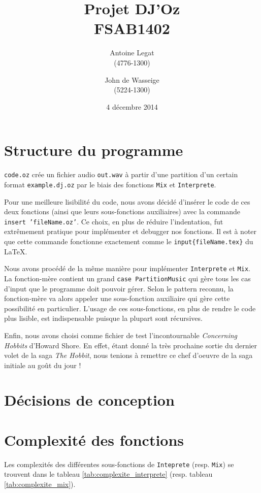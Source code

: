 \documentclass[a4paper,oneside,10pt]{article}
\title{Projet DJ'Oz \\ \small{FSAB1402}}
\author{Antoine Legat \\(4776-1300) \and John de Wasseige \\(5224-1300)}
\date{4 décembre 2014}
\newcommand{\fun}[1]{\texttt{#1}}
\newcommand{\bslash}{\texttt{\symbol{92}}}
\begin{document}
\maketitle

\section{Structure du programme}
\fun{code.oz} crée un fichier audio \fun{out.wav} à partir d'une partition d'un certain format \fun{example.dj.oz} par le biais des fonctions \fun{Mix} et \fun{Interprete}.

Pour une meilleure lisibilité du code, nous avons décidé d'insérer le code de ces deux fonctions (ainsi que leurs sous-fonctions auxiliaires) avec la commande \fun{\bslash insert 'fileName.oz'}. Ce choix, en plus de réduire l'indentation, fut extrêmement pratique pour implémenter et debugger nos fonctions. Il est à noter que cette commande fonctionne exactement comme le \fun{\bslash input\{fileName.tex\}} du \LaTeX.

Nous avons procédé de la même manière pour implémenter \fun{Interprete} et \fun{Mix}. La fonction-mère contient un grand \fun{case Partition\bslash Music} qui gère tous les cas d'input que le programme doit pouvoir gérer. Selon le pattern reconnu, la fonction-mère va alors appeler une sous-fonction auxiliaire qui gère cette possibilité en particulier. L'usage de ces sous-fonctions, en plus de rendre le code plus lisible, est indispensable puisque la plupart sont récursives.

Enfin, nous avons choisi comme fichier de test l'incontournable \textit{Concerning Hobbits} d'Howard Shore. En effet, étant donné la très prochaine sortie du dernier volet de la saga \textit{The Hobbit}, nous tenions à remettre ce chef d'oeuvre de la saga initiale au goût du jour !

\section{Décisions de conception}

\section{Complexité des fonctions}

Les complexités des différentes sous-fonctions de \fun{Inteprete} (resp. \fun{Mix})
se trouvent dans le tableau \ref{tab:complexite_interprete} 
(resp. tableau \ref{tab:complexite_mix}).
\end{document}
